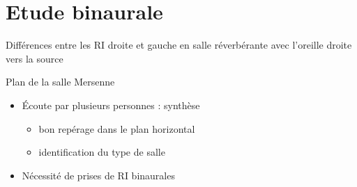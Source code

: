 \documentclass{beamer}
\begin{document}
\section{Etude binaurale}

\begin{frame}
\begin{figure}
\end{figure}
\begin{center}
Différences entre les RI droite et gauche en salle réverbérante avec l'oreille droite vers la source
\end{center}
\end{frame}

\begin{frame}
\begin{figure}
\end{figure}
\begin{center}
Plan de la salle Mersenne
\end{center}
\end{frame}

\begin{frame}
\begin{itemize}
    \item Écoute par plusieurs personnes : synthèse
    \begin{itemize}
        \item bon repérage dans le plan horizontal
        \item identification du type de salle
    \end{itemize}
    \item Nécessité de prises de RI binaurales
\end{itemize}
 \end{frame}
\end{document}
